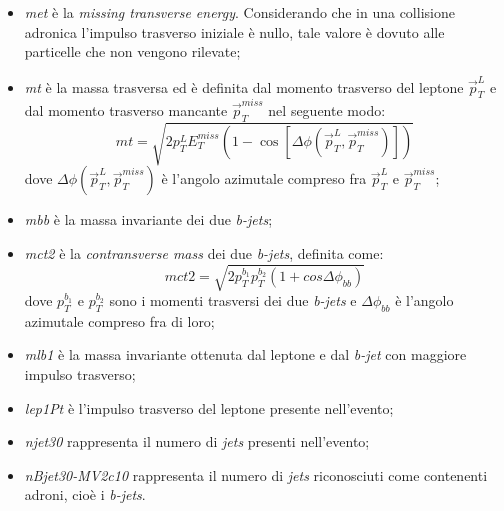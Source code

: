 \begin{itemize}
	\item \textit{met} è la \textit{missing transverse energy}. Considerando che in una collisione adronica l'impulso trasverso iniziale è nullo, tale valore è dovuto alle particelle che non vengono rilevate;
	
	\item \textit{mt} è la massa trasversa ed è definita dal momento trasverso del leptone $\vec{p}_T^L$ e dal momento trasverso mancante $\vec{p}_T^{miss}$ nel seguente modo:
		\begin{equation}
			mt = \sqrt{2p_T^L E_T^{miss}(1 - \cos[\Delta\phi (\vec{p}_T^L , \vec{p}_T^{miss})])}
		\end{equation}
	dove $\Delta\phi(\vec{p}_T^L , \vec{p}_T^{miss})$ è l'angolo azimutale compreso fra $\vec{p}_T^L$ e $\vec{p}_T^{miss}$;
	
	\item \textit{mbb} è la massa invariante dei due \textit{b-jets};
	
	\item \textit{mct2} è la \textit{contransverse mass} dei due \textit{b-jets}, definita come:
		\begin{equation}
			mct2 = \sqrt{2p_T^{b_1} p_T^{b_2} (1 + cos \Delta\phi_{bb})}
		\end{equation}
	dove $p_T^{b_1}$ e $p_T^{b_2}$ sono i momenti trasversi dei due \textit{b-jets} e $\Delta\phi_{bb}$ è l'angolo azimutale compreso fra di loro;
	
	\item \textit{mlb1} è la massa invariante ottenuta dal leptone e dal \textit{b-jet} con maggiore impulso trasverso;
	
	\item \textit{lep1Pt} è l'impulso trasverso del leptone presente nell'evento;
	
	\item \textit{njet30} rappresenta il numero di \textit{jets} presenti nell'evento;
	
	\item \textit{nBjet30-MV2c10} rappresenta il numero di \textit{jets} riconosciuti come contenenti adroni, cioè i \textit{b-jets}.
\end{itemize} 

